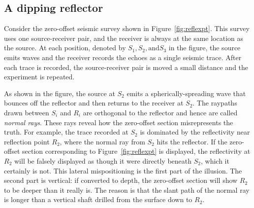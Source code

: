 \subsection{A dipping reflector}
\par
Consider the zero-offset seismic survey shown in Figure~\ref{fig:reflexpt}.
This survey  uses one source-receiver pair,
and the receiver is always at the same location as the source.
At each position, denoted by 
$S_1, S_2, \mbox{and} S_3$ in the figure,
the source emits waves and the receiver records the echoes
as a single seismic trace.
After each trace is recorded,
the source-receiver pair is moved a small distance
and the experiment is repeated.
%
%
\par
As shown in the figure,
the source at $S_2$ emits a spherically-spreading wave
that bounces off the reflector
and then returns to the receiver at $S_2$.
The raypaths drawn between $S_i$ and $R_i$ are orthogonal
to the reflector and hence are called {\em normal rays}.
These rays reveal how the zero-offset section misrepresents the truth. 
For example,
the trace recorded at $S_2$ is dominated by the reflectivity 
near reflection point $R_2$,
where the normal ray from $S_2$ hits the reflector.   
If the zero-offset section corresponding to Figure~\ref{fig:reflexpt} is displayed, 
the reflectivity at $R_2$ will be falsely displayed
as though it were directly beneath $S_2$,
which it certainly is not.
This lateral mispositioning is the first part of the illusion.
The second part is vertical:
if converted to depth,
the zero-offset section will show $R_2$ to be deeper than it really is.
The reason is that the slant path of the normal ray
is longer than a vertical shaft drilled from the surface down to $R_2$.


